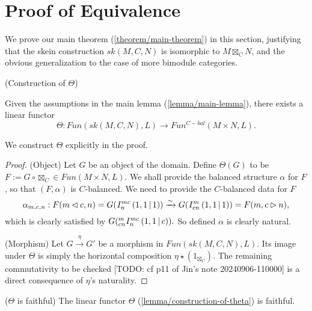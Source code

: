 \section{Proof of Equivalence}\label{section/proof-of-equivalence}

We prove our main theorem (\ref{theorem/main-theorem}) in this section, justifying that the skein
construction $sk(M,C,N)$ is isomorphic to $M \boxtimes_{C} N$, and the obvious
generalization to the case of more bimodule categories.

\begin{lemma}\label{lemma/construction-of-theta} (Construction of $\Theta$)

  \noindent Given the assumptions in the main lemma (\ref{lemma/main-lemma}),
  there exists a linear functor
  \[
    \Theta: Fun(sk(M,C,N), L) \to Fun^{C-bal}(M \times N, L).
  \]
\end{lemma}

\noindent We construct $\Theta$ explicitly in the proof.

\begin{proof}
  \noindent (Object) Let $G$ be an object of the domain. Define $\Theta(G)$ to
  be $F := G \circ \boxtimes_{C} \in Fun(M \times N, L)$. We shall provide the
  balanced structure $\alpha$ for $F$, so that $(F, \alpha)$ is $C$-balanced. 
  We need to provide the $C$-balanced data for $F$
  \[
    \alpha_{m,c,n}: F(m \lhd c, n) = G({}^{}_{} I^{mc}_{n} \left( 1, 1 \,\middle|\, 1 \right)) \xrightarrow{\sim} G({}^{}_{} I^{m}_{cn} \left( 1, 1 \,\middle|\, 1 \right)) = F(m, c \rhd n),
  \]
  which is clearly satisfied by $G({}^{m}_{cn} I^{mc}_{n} \left( 1, 1 \,\middle|\, c \right)).$ So defined $\alpha$ is clearly natural.

  \noindent (Morphism) Let $G \xrightarrow{\eta} G'$ be a morphism in
  $Fun(sk(M,C,N), L)$. Its image under $\Theta$ is simply the horizontal
  composition $\eta \star (1_{\boxtimes_{C}})$. The remaining commutativity to be checked
  [TODO: cf p11 of Jin's note 20240906-110000] is a direct consequence of
  $\eta$'s naturality.
\end{proof}

\begin{lemma}\label{lemma/theta-is-faithful} ($\Theta$ is faithful) The linear
  functor $\Theta$ (\ref{lemma/construction-of-theta}) is faithful.
\end{lemma}

